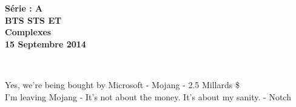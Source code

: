 \documentclass[11pt]{article}
\begin{document}

\begin{minipage}[t]{\textwidth}
  \raggedright
      {\bfseries Série : \textbf{A}}\\
      {\bfseries BTS STS ET}\\[.35ex]
      \vspace*{-1cm}
      \raggedleft
          {\bfseries Complexes}\\[.35ex]
          {\bfseries 15 Septembre 2014}\\[.35ex]
\end{minipage}\\[1em]

\begin{center}
  \textsf{Yes, we’re being bought by Microsoft - Mojang - 2.5 Millards \$}\\
  \textsf{I’m leaving Mojang - It’s not about the money. It’s about my sanity. - Notch}
\end{center}
\end{document}

